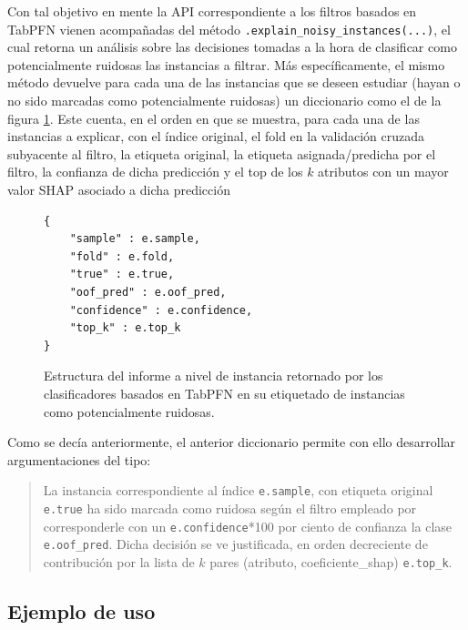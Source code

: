 \documentclass[print, color]{ugrTFG}
\begin{document}
 
 Con tal objetivo en mente la API correspondiente a los filtros basados en TabPFN vienen acompañadas del método \texttt{.explain\_noisy\_instances(...)}, el cual retorna un análisis sobre las decisiones tomadas a la hora de clasificar como potencialmente ruidosas las instancias a filtrar. Más específicamente, el mismo método devuelve para cada una de las instancias que se deseen estudiar (hayan o no sido marcadas como potencialmente ruidosas) un diccionario como el de la figura \ref{fig:TPFN_explainabilityDict}. Este cuenta, en el orden en que se muestra, para cada una de las instancias a explicar, con el índice original, el fold en la validación cruzada subyacente al filtro, la etiqueta original, la etiqueta asignada/predicha por el filtro, la confianza de dicha predicción y el top de los $k$ atributos con un mayor valor SHAP asociado a dicha predicción 


\begin{figure}[h]
    \centering
    \begin{minipage}{0.75\linewidth}
\begin{verbatim}
{
    "sample" : e.sample,
    "fold" : e.fold,
    "true" : e.true,
    "oof_pred" : e.oof_pred,
    "confidence" : e.confidence,
    "top_k" : e.top_k
}
\end{verbatim}
    \end{minipage}
    \caption{Estructura del informe a nivel de instancia retornado por los clasificadores basados en TabPFN en su etiquetado de instancias como potencialmente ruidosas.}
    \label{fig:TPFN_explainabilityDict}
\end{figure}

 
 Como se decía anteriormente, el anterior diccionario permite con ello desarrollar argumentaciones del tipo: 
 
 \begin{quote}
  La instancia correspondiente al  índice \texttt{e.sample}, con etiqueta original \texttt{e.true} ha sido marcada como ruidosa según el filtro empleado por corresponderle con un \texttt{e.confidence}*100 por ciento de confianza la clase \texttt{e.oof\_pred}. Dicha decisión se ve justificada, en orden decreciente de contribución por la lista de $k$ pares (atributo, coeficiente\_shap)  \texttt{e.top\_k}.
 \end{quote}

\subsection{Ejemplo de uso}
\end{document}
